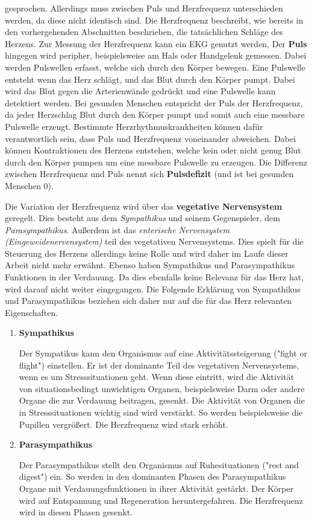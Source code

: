 gesprochen. Allerdings muss zwischen Puls und Herzfrequenz unterschieden werden, da diese nicht identisch sind. 
Die Herzfrequenz beschreibt, wie bereits in den vorhergehenden Abschnitten beschrieben, die tatsächlichen Schläge des Herzens. Zur Messung der Herzfrequenz kann ein EKG genutzt werden,
Der \textbf{Puls} hingegen wird peripher, beispielsweise am Hals oder Handgelenk gemessen. Dabei werden Pulswellen erfasst, welche sich durch den Körper bewegen. Eine Pulswelle entsteht wenn das Herz schlägt, und das Blut durch den Körper pumpt. Dabei wird das Blut gegen die Arterienwände gedrückt und eine Pulswelle kann detektiert werden.
Bei gesunden Menschen entspricht der Puls der Herzfrequenz, da jeder Herzschlag Blut durch den Körper pumpt und somit auch eine messbare Pulswelle erzeugt. Bestimmte Herzrhythmuskrankheiten können dafür verantwortlich sein, dass Puls und Herzfrequenz voneinander abweichen. Dabei können Kontraktionen des Herzens entstehen, welche kein oder nicht genug Blut durch den Körper pumpen um eine messbare Pulswelle zu erzeugen. Die Differenz zwischen Herzfrequenz und Puls nennt sich \textbf{Pulsdefizit} (und ist bei gesunden Menschen 0). \cite{babilon}

Die Variation der Herzfrequenz wird über das \textbf{vegetative Nervensystem} geregelt. Dies besteht aus dem \textit{Sympathikus} und seinem Gegenspieler, dem \textit{Parasympathikus}. Außerdem ist das \textit{enterische Nervensystem (Eingeweidenervensystem)} teil des vegetativen Nervensystems. Dies spielt für die Steuerung des Herzens allerdings keine Rolle und wird daher im Laufe dieser Arbeit nicht mehr erwähnt. Ebenso haben Sympathikus und Parasympathikus Funktionen in der Verdauung. Da dies ebenfalls keine Relevanz für das Herz hat, wird darauf nicht weiter eingegangen. Die Folgende Erklärung von Sympathikus und Parasympathikus beziehen sich daher nur auf die für das Herz relevanten Eigenschaften.\cite{veg}

\begin{enumerate}
	\item \textbf{Sympathikus} 
	
	Der Sympatikus kann den Organismus auf eine Aktivitätssteigerung ("fight or flight") einstellen. Er ist der dominante Teil des vegetativen Nervensystems, wenn es um Stresssituationen geht. Wenn diese eintritt, wird die Aktivität von situationsbedingt unwichtigen Organen, beispielsweise Darm oder andere Organe die zur Verdauung beitragen, gesenkt. 
	Die Aktivität von Organen die in Stresssituationen wichtig sind wird verstärkt. So werden beispielsweise die Pupillen vergrößert.
Die Herzfrequenz wird stark erhöht.\cite{sym}	
	
	\item \textbf{Parasympathikus}
	
	Der Parasympathikus stellt den Organismus auf Ruhesituationen ("rest and digest") ein. So werden in den dominanten Phasen des Parasympathikus Organe mit Verdauungsfunktionen in ihrer Aktivität gestärkt. Der Körper wird auf Entspannung und Regeneration heruntergefahren. 
	Die Herzfrequenz wird in diesen Phasen gesenkt.\cite{para}
\end{enumerate}

